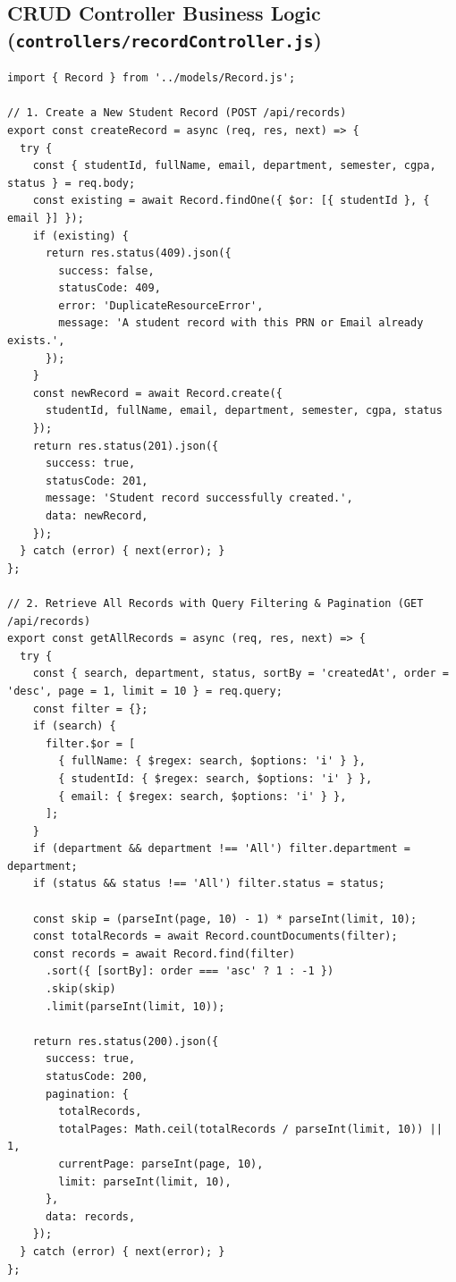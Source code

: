 \documentclass[11pt,a4paper]{article}
\begin{document}
\subsection{CRUD Controller Business Logic (\texttt{controllers/recordController.js})}
\begin{lstlisting}[caption={RESTful CRUD Business Logic and Validation Handlers (\texttt{controllers/recordController.js})}]
import { Record } from '../models/Record.js';

// 1. Create a New Student Record (POST /api/records)
export const createRecord = async (req, res, next) => {
  try {
    const { studentId, fullName, email, department, semester, cgpa, status } = req.body;
    const existing = await Record.findOne({ $or: [{ studentId }, { email }] });
    if (existing) {
      return res.status(409).json({
        success: false,
        statusCode: 409,
        error: 'DuplicateResourceError',
        message: 'A student record with this PRN or Email already exists.',
      });
    }
    const newRecord = await Record.create({
      studentId, fullName, email, department, semester, cgpa, status
    });
    return res.status(201).json({
      success: true,
      statusCode: 201,
      message: 'Student record successfully created.',
      data: newRecord,
    });
  } catch (error) { next(error); }
};

// 2. Retrieve All Records with Query Filtering & Pagination (GET /api/records)
export const getAllRecords = async (req, res, next) => {
  try {
    const { search, department, status, sortBy = 'createdAt', order = 'desc', page = 1, limit = 10 } = req.query;
    const filter = {};
    if (search) {
      filter.$or = [
        { fullName: { $regex: search, $options: 'i' } },
        { studentId: { $regex: search, $options: 'i' } },
        { email: { $regex: search, $options: 'i' } },
      ];
    }
    if (department && department !== 'All') filter.department = department;
    if (status && status !== 'All') filter.status = status;

    const skip = (parseInt(page, 10) - 1) * parseInt(limit, 10);
    const totalRecords = await Record.countDocuments(filter);
    const records = await Record.find(filter)
      .sort({ [sortBy]: order === 'asc' ? 1 : -1 })
      .skip(skip)
      .limit(parseInt(limit, 10));

    return res.status(200).json({
      success: true,
      statusCode: 200,
      pagination: {
        totalRecords,
        totalPages: Math.ceil(totalRecords / parseInt(limit, 10)) || 1,
        currentPage: parseInt(page, 10),
        limit: parseInt(limit, 10),
      },
      data: records,
    });
  } catch (error) { next(error); }
};


\end{lstlisting}
\end{document}

